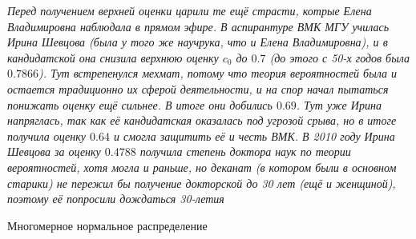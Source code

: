 \documentclass[a4paper,11pt]{article}
\begin{document}
\renewcommand{\thletter}{неравенство Берри-Эссеена}
\textit{Перед получением верхней оценки царили те ещё страсти, котрые Елена Владимировна наблюдала в прямом эфире. В аспирантуре ВМК МГУ училась Ирина Шевцова (была у того же научрука, что и Елена Владимировна), и в кандидатской она снизила верхнюю оценку $c_0$ до $0.7$ (до этого с 50-х годов была $0.7866$). Тут встрепенулся мехмат, потому что теория вероятностей была и остается традиционно их сферой деятельности, и на спор начал пытаться понижать оценку ещё сильнее. В итоге они добились $0.69$. Тут уже Ирина напряглась, так как её кандидатская оказалась под угрозой срыва, но в итоге получила оценку $0.64$ и смогла защитить её и честь ВМК. В 2010 году Ирина Шевцова за оценку $0.4788$ получила степень доктора наук по теории вероятностей, хотя могла и раньше, но деканат (в котором были в основном старики) не пережил бы получение докторской до 30 лет (ещё и женщиной), поэтому её попросили дождаться 30-летия}
\newpage
\begin{center}
    \huge Многомерное нормальное распределение
\end{center}
\setcounter{maindf}{12}
\setcounter{subdf}{0}

\setcounter{mainth}{12}
\setcounter{subth}{0}

\setcounter{mainpr}{12}
\setcounter{subpr}{0}

\setcounter{mainex}{12}
\setcounter{subex}{0}
\end{document}
